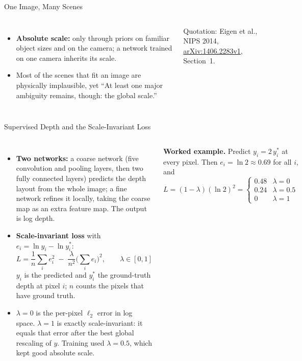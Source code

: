 \begin{frame}{One Image, Many Scenes}
\begin{columns}[T,onlytextwidth]
\begin{itemize}
        \item \textbf{Absolute scale:} only through priors on familiar object sizes and on the camera; a network trained on one camera inherits its scale.
        \item Most of the scenes that fit an image are physically implausible, yet ``At least one major ambiguity remains, though: the global scale.''
      \end{itemize}
      \vspace{0.1em}
      {\scriptsize Quotation: Eigen et al., NIPS 2014, \href{https://arxiv.org/abs/1406.2283v1}{arXiv:1406.2283v1}, Section~1.\par}
  \end{columns}
\end{frame}

\begin{frame}{Supervised Depth and the Scale-Invariant Loss}
  \begin{columns}[T,onlytextwidth]
      \begin{itemize}\footnotesize\itemsep0.3em
        \item \textbf{Two networks:} a coarse network (five convolution and pooling layers, then two fully connected layers) predicts the depth layout from the whole image; a fine network refines it locally, taking the coarse map as an extra feature map. The output is log depth.
        \item \textbf{Scale-invariant loss} with $e_i = \ln y_i - \ln y_i^*$:
        \[ L = \frac{1}{n}\sum_i e_i^2 \;-\; \frac{\lambda}{n^2}\Big(\sum_i e_i\Big)^2, \qquad \lambda\in[0,1] \]
        $y_i$ is the predicted and $y_i^*$ the ground-truth depth at pixel $i$; $n$ counts the pixels that have ground truth.
        \item $\lambda=0$ is the per-pixel $\ell_2$ error in log space. $\lambda=1$ is exactly scale-invariant: it equals that error after the best global rescaling of $y$. Training used $\lambda=0.5$, which kept good absolute scale.
      \end{itemize}
      \begin{tcolorbox}[colframe=KAred, colback=gray!6, boxrule=0.5pt, left=4pt, right=4pt, top=3pt, bottom=3pt]
        \footnotesize\textbf{Worked example.} Predict $y_i = 2\,y_i^*$ at every pixel. Then $e_i = \ln 2 \approx 0.69$ for all $i$, and
        \[ L = (1-\lambda)(\ln 2)^2 = \begin{cases} 0.48 & \lambda=0\\ 0.24 & \lambda=0.5\\ 0 & \lambda=1 \end{cases} \]

\end{tcolorbox}
\end{columns}
\end{frame}
